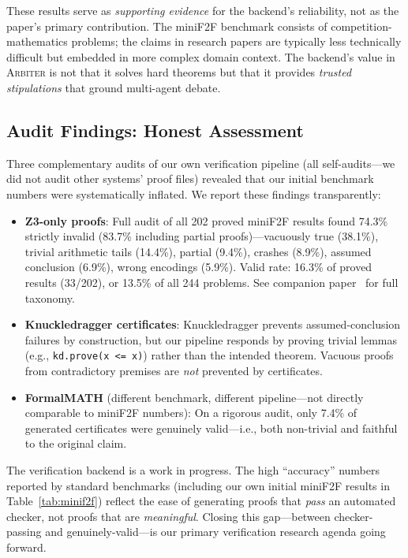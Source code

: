 \documentclass[11pt]{article}
\newcommand{\arbiter}{\textsc{Arbiter}}
\begin{document}
These results serve as \emph{supporting evidence} for the backend's reliability, not as the paper's primary contribution.
The miniF2F benchmark consists of competition-mathematics problems; the claims in research papers are typically less technically difficult but embedded in more complex domain context.
The backend's value in \arbiter{} is not that it solves hard theorems but that it provides \emph{trusted stipulations} that ground multi-agent debate.

\subsection{Audit Findings: Honest Assessment}

Three complementary audits of our own verification pipeline (all self-audits---we did not audit other systems' proof files) revealed that our initial benchmark numbers were systematically inflated.
We report these findings transparently:

\begin{itemize}[leftmargin=*,itemsep=2pt]
\item \textbf{Z3-only proofs}: Full audit of all 202 proved miniF2F results found 74.3\% strictly invalid (83.7\% including partial proofs)---vacuously true (38.1\%), trivial arithmetic tails (14.4\%), partial (9.4\%), crashes (8.9\%), assumed conclusion (6.9\%), wrong encodings (5.9\%). Valid rate: 16.3\% of proved results (33/202), or 13.5\% of all 244 problems. See companion paper~\cite{arbiterpaperA} for full taxonomy.
\item \textbf{Knuckledragger certificates}: Knuckledragger prevents assumed-conclusion failures by construction, but our pipeline responds by proving trivial lemmas (e.g., \texttt{kd.prove(x <= x)}) rather than the intended theorem. Vacuous proofs from contradictory premises are \emph{not} prevented by certificates.
\item \textbf{FormalMATH} (different benchmark, different pipeline---not directly comparable to miniF2F numbers): On a rigorous audit, only 7.4\% of generated certificates were genuinely valid---i.e., both non-trivial and faithful to the original claim.
\end{itemize}

\noindent The verification backend is a work in progress.
The high ``accuracy'' numbers reported by standard benchmarks (including our own initial miniF2F results in Table~\ref{tab:minif2f}) reflect the ease of generating proofs that \emph{pass} an automated checker, not proofs that are \emph{meaningful}.
Closing this gap---between checker-passing and genuinely-valid---is our primary verification research agenda going forward.
\end{document}
